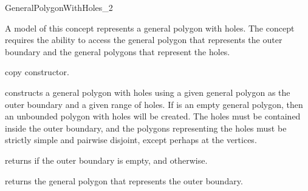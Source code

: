 \ccRefPageBegin

\def\ccLongParamLayout{\ccFalse}
\begin{ccRefConcept}{GeneralPolygonWithHoles_2}

\ccTypes
\ccThreeToTwo




\ccDefinition
A model of this concept represents a general polygon with holes. The
concept requires the ability to access the general polygon that
represents the outer boundary and the general polygons that represent
the holes.

\ccThreeToTwo

\ccCreation
{}

\ccGlue
{}
{copy constructor.}
\ccGlue
{}

{constructs a general polygon with holes using a given general polygon 
as the outer boundary and a given range of holes. If  is an empty
general polygon, then an unbounded polygon with holes will be created. The holes must be
contained inside the outer boundary, and the polygons representing the holes 
must be strictly simple and pairwise disjoint, except perhaps at the vertices.}

\ccPredicates
{returns  if the outer boundary is empty, and 
otherwise.}

\ccAccessFunctions

{returns the general polygon that represents the outer boundary. }



\end{ccRefConcept}
